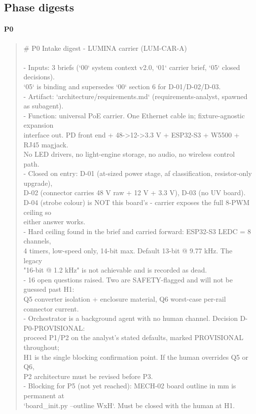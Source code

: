 \documentclass[11pt,a4paper]{article}
\begin{document}
\subsection*{Phase digests}
\paragraph*{P0}
\begin{quote}\small\ttfamily\raggedright
\# P0 Intake digest - LUMINA carrier (LUM-CAR-A)\\
~\\
- Inputs: 3 briefs (`00` system context v2.0, `01` carrier brief, `05` closed decisions).\\
  `05` is binding and supersedes `00` section 6 for D-01/D-02/D-03.\\
- Artifact: `architecture/requirements.md` (requirements-analyst, spawned as subagent).\\
- Function: universal PoE carrier. One Ethernet cable in; fixture-agnostic expansion\\
  interface out. PD front end + 48-\textgreater{}12-\textgreater{}3.3 V + ESP32-S3 + W5500 + RJ45 magjack.\\
  No LED drivers, no light-engine storage, no audio, no wireless control path.\\
- Closed on entry: D-01 (at-sized power stage, af classification, resistor-only upgrade),\\
  D-02 (connector carries 48 V raw + 12 V + 3.3 V), D-03 (no UV board).\\
  D-04 (strobe colour) is NOT this board's - carrier exposes the full 8-PWM ceiling so\\
  either answer works.\\
- Hard ceiling found in the brief and carried forward: ESP32-S3 LEDC = 8 channels,\\
  4 timers, low-speed only, 14-bit max. Default 13-bit @ 9.77 kHz. The legacy\\
  "16-bit @ 1.2 kHz" is not achievable and is recorded as dead.\\
- 16 open questions raised. Two are SAFETY-flagged and will not be guessed past H1:\\
  Q5 converter isolation + enclosure material, Q6 worst-case per-rail connector current.\\
- Orchestrator is a background agent with no human channel. Decision D-P0-PROVISIONAL:\\
  proceed P1/P2 on the analyst's stated defaults, marked PROVISIONAL throughout;\\
  H1 is the single blocking confirmation point. If the human overrides Q5 or Q6,\\
  P2 architecture must be revised before P3.\\
- Blocking for P5 (not yet reached): MECH-02 board outline in mm is permanent at\\
  `board\_init.py --outline WxH`. Must be closed with the human at H1.
\end{quote}
\end{document}
